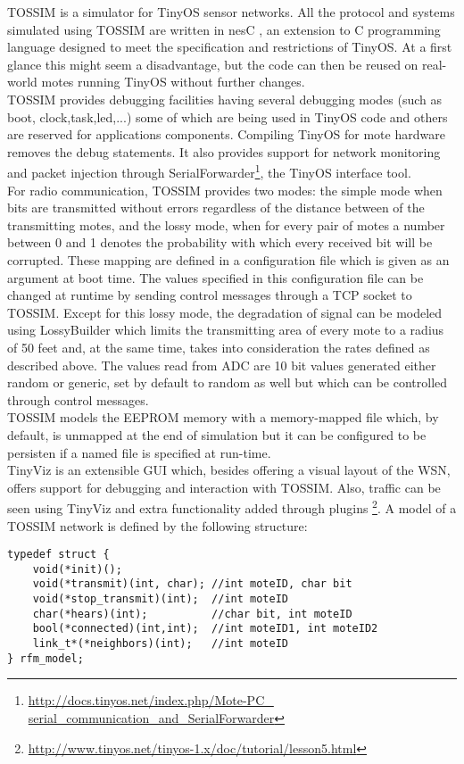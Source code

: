 \label{subsec:tossim}
TOSSIM\cite{tossim} is a simulator for TinyOS sensor networks.
All the protocol and systems simulated using TOSSIM are written in nesC \cite{nesC},
an extension to C programming language designed to meet the specification and 
restrictions of TinyOS. At a first glance this might seem a disadvantage, but 
the code can then be reused on real-world motes running TinyOS
without further changes.
\\
TOSSIM provides debugging facilities having several debugging modes 
(such as boot, clock,task,led,...) some of which are being used in TinyOS code
and others are reserved for applications components. Compiling TinyOS for mote
hardware removes the debug statements.
It also provides support for network monitoring and packet injection
through SerialForwarder\footnote{\url{http://docs.tinyos.net/index.php/Mote-PC_
serial_communication_and_SerialForwarder}}, the TinyOS interface tool.
\\
For radio communication, TOSSIM provides two modes: the simple mode when bits
are transmitted without errors regardless of the distance between of the transmitting
motes, and the lossy mode, when for every pair of motes a number between 0 and 1 
denotes the probability with which every received bit will be corrupted. These 
mapping are defined in a configuration file which is given as an argument at boot
time. The values specified in this configuration file can be changed at runtime
by sending control messages through a TCP socket to TOSSIM.
 Except for this lossy mode, the degradation of signal can be modeled using
LossyBuilder which limits the transmitting area of every mote to a radius of 50
 feet and, at the same time, takes into consideration the rates defined as 
described above.
The values read from ADC are 10 bit values generated either random or generic, set
by default to random as well but which can be controlled through control messages.
\\
TOSSIM models the EEPROM memory with a memory-mapped file which, by default, is
unmapped at the end of simulation but it can be configured to be persisten if a
named file is specified at run-time.
\\
TinyViz is an extensible GUI which, besides offering a visual layout of the 
WSN, offers support for debugging and interaction with TOSSIM. Also, traffic can
be seen using TinyViz and extra functionality added through plugins
\footnote{\url{http://www.tinyos.net/tinyos-1.x/doc/tutorial/lesson5.html}}.
A model of a TOSSIM network is defined by the following structure:
\begin{lstlisting}
typedef struct {
    void(*init)();
    void(*transmit)(int, char); //int moteID, char bit
    void(*stop_transmit)(int);  //int moteID
    char(*hears)(int);          //char bit, int moteID
    bool(*connected)(int,int);  //int moteID1, int moteID2
    link_t*(*neighbors)(int);   //int moteID
} rfm_model;
\end{lstlisting}

